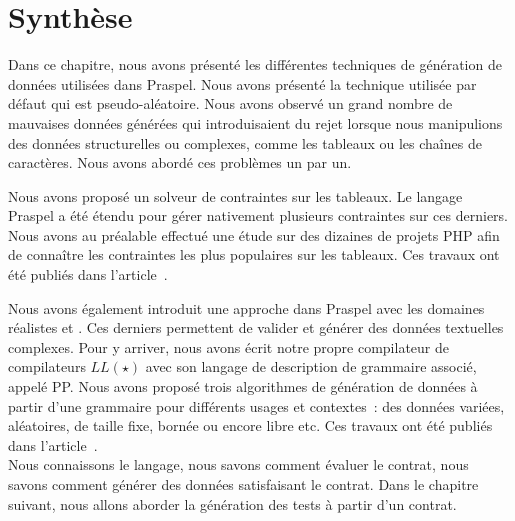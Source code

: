 \section{Synthèse}
\label{section:data:summary}

Dans ce chapitre, nous avons présenté les différentes techniques de génération
de données utilisées dans Praspel. Nous avons présenté la technique utilisée par
défaut qui est pseudo-aléatoire. Nous avons observé un grand nombre de mauvaises
données générées qui introduisaient du rejet lorsque nous manipulions des
données structurelles ou complexes, comme les tableaux ou les chaînes de
caractères. Nous avons abordé ces problèmes un par un.

Nous avons proposé un solveur de contraintes sur les tableaux. Le langage
Praspel a été étendu pour gérer nativement plusieurs contraintes sur ces
derniers. Nous avons au préalable effectué une étude sur des dizaines de projets
PHP afin de connaître les contraintes les plus populaires sur les tableaux. Ces
travaux ont été publiés dans l'article~.

Nous avons également introduit une approche 
dans Praspel avec les domaines réalistes  et . Ces
derniers permettent de valider et générer des données textuelles complexes.
Pour y arriver, nous avons écrit notre propre compilateur de compilateurs
$LL(\star)$ avec son langage de description de grammaire associé, appelé PP.
Nous avons proposé trois algorithmes de génération de données à partir d'une
grammaire pour différents usages et contextes~: des données variées, aléatoires,
de taille fixe, bornée ou encore libre etc. Ces travaux ont été publiés dans
l'article~. \\

Nous connaissons le langage, nous savons comment évaluer le contrat, nous savons
comment générer des données satisfaisant le contrat. Dans le chapitre suivant,
nous allons aborder la génération des tests à partir d'un contrat.
